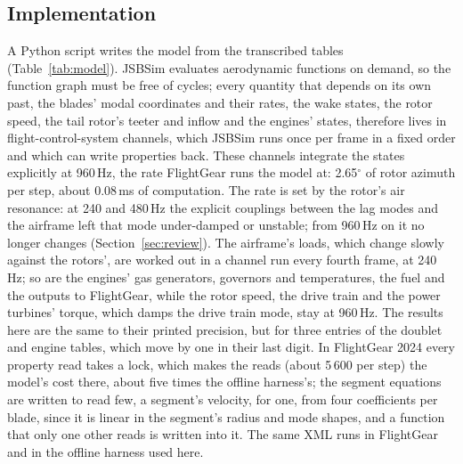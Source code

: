 \documentclass[10pt,a4paper,twocolumn]{article}
\newcommand{\Tab}[1]{}
\begin{document}
\subsection{Implementation}
A Python script writes the model from the transcribed tables (Table~\ref{tab:model}). JSBSim evaluates aerodynamic functions on
demand, so the function graph must be free of cycles; every quantity that depends on its own past, the blades' modal
coordinates and their rates, the wake states, the rotor speed, the tail rotor's teeter and inflow and the engines' states, therefore lives in
flight-control-system channels, which JSBSim runs once per frame in a fixed order and which can write properties back. These channels
integrate the states explicitly at 960\,Hz, the rate FlightGear runs the model at: 2.65$^\circ$ of rotor azimuth per step, about
0.08\,ms of computation. The rate is set by the rotor's air resonance: at 240 and 480\,Hz the explicit couplings between the lag modes and
the airframe left that mode under-damped or unstable; from 960\,Hz on it no longer changes (Section~\ref{sec:review}). The airframe's
loads, which change slowly against the rotors', are worked out in a channel run every fourth frame, at 240\,Hz; so are the engines'
gas generators, governors and temperatures, the fuel and the outputs to FlightGear, while the rotor speed, the drive train and the
power turbines' torque, which damps the drive train mode, stay at 960\,Hz. The results here are the same to their printed precision,
but for three entries of the doublet and engine tables, which move by one in their last digit. In FlightGear 2024 every property
read takes a lock, which makes the reads (about 5\,600 per step) the model's cost there, about five times the offline harness's; the
segment equations are written to read few, a segment's velocity, for one, from four coefficients per blade, since it is linear in the
segment's radius and mode shapes, and a function that only one other reads is written into it. The same XML runs in FlightGear and
in the offline harness used here.

\begin{table}[t]
\centering\small
\caption{The generated model: JSBSim system files, their content and the number of named aerodynamic functions or
control-system components.}\label{tab:model}
\Tab{model}
\end{table}
\end{document}

